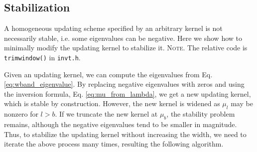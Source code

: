 \documentclass[reprint, superscriptaddress, floatfix]{revtex4-1}
\newcommand{\note}[1]{{\color{DarkGreen}\footnotesize \textsc{Note.} #1}}
\begin{document}




\subsection{\label{sec:stabilize_wband}
Stabilization}



%
A homogeneous updating scheme
specified by an arbitrary kernel
is not necessarily stable,
i.e. some eigenvalues can be negative.
%
Here we show how to minimally modify
the updating kernel
to stabilize it.
%
\note{The relative code is \texttt{trimwindow()} in \texttt{invt.h}.
}


Given an updating kernel,
we can compute the eigenvalues from
Eq. \eqref{eq:wband_eigenvalue}.
%
By replacing negative eigenvalues with zeros and
using the inversion formula,
Eq. \eqref{eq:mu_from_lambda},
we get a new updating kernel,
which is stable by construction.
%
However, the new kernel is widened
as $\mu_l$ may be nonzero for $l > b$.
%
If we truncate the new kernel at $\mu_b$,
the stability problem remains,
although the negative eigenvalues
tend to be smaller in magnitude.
%
Thus, to stabilize the updating kernel
without increasing the width,
we need to iterate the above process many times,
resulting the following algorithm.
\end{document}
